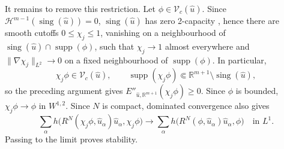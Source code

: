 \documentclass[11pt]{article}
\theoremstyle{plain}
\numberwithin{equation}{section}
\theoremstyle{definition}
\let\oldendproof\endproof
\renewenvironment{proof}[1][\proofname]{%
\oldproof[\upshape \bfseries #1]%
}{\oldendproof}
\def \R {\mathbb{R}}
\def \mc{\mathcal}
\DeclareMathOperator{\sing}{sing}
\DeclareMathOperator{\supp}{supp}
\begin{document}
\begin{proof}
It remains to remove this restriction.  Let $\phi\in\mc V_c(\hat u)$.
Since $\mc H^{m-1}(\sing(\hat u))=0$, $\sing(\hat u)$ has zero 2-capacity \cite{Evans2015}, hence there are smooth cutoffs
$0\leq\chi_j\leq1$, vanishing on
a neighbourhood of $\sing(\hat u)\cap\supp(\phi)$, such that $\chi_j\to1$
almost everywhere and $\|\nabla\chi_j\|_{L^2}\to0$ on a fixed
neighbourhood of $\supp(\phi)$.  In particular,
\[
    \chi_j\phi\in\mc V_c(\hat u),
    \qquad
    \supp(\chi_j\phi)\Subset\R^{m+1}\setminus\sing(\hat u),
\]
so the preceding argument gives
$E''_{\hat u,\R^{m+1}}(\chi_j\phi)\geq0$.  Since $\phi$ is bounded,
$\chi_j\phi\to\phi$ in $W^{1,2}$.  Since $N$ is compact, dominated
convergence also gives
\[
\sum_\alpha
h\bigl(R^N(\chi_j\phi,\hat u_\alpha)\hat u_\alpha,\chi_j\phi\bigr)
\longrightarrow
\sum_\alpha
h\bigl(R^N(\phi,\hat u_\alpha)\hat u_\alpha,\phi\bigr)
\quad\text{in }L^1.
\]
Passing to the limit proves stability.
\end{proof}
\end{document}

